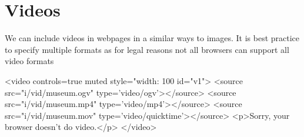 \section*{Videos}
We can include videos in webpages in a similar ways to images. It is best practice to specify multiple formats as for legal reasons not all browsers can support all video formats
\begin{html}
<video
  controls=true
  muted
  style="width: 100%
  id="v1">
  <source src="i/vid/museum.ogv" type='video/ogv'></source>
  <source src="i/vid/museum.mp4" type='video/mp4'></source>
  <source src="i/vid/museum.mov" type='video/quicktime'></source>
  <p>Sorry, your browser doesn't do video.</p>
</video>
\end{html}